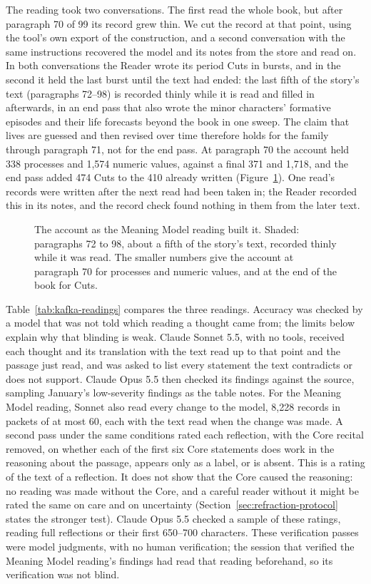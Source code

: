 \documentclass[11pt]{article}
\begin{document}
The reading took two conversations. The first read the whole book, but after
paragraph 70 of 99 its record grew thin. We cut the record at that point, using
the tool's own export of the construction, and a second conversation with the
same instructions recovered the model and its notes from the store and read on.
In both conversations the Reader wrote its period Cuts in bursts, and in the
second it held the last burst until the text had ended: the last fifth of the
story's text (paragraphs 72--98) is recorded thinly while it is read and filled in
afterwards, in an end pass that also wrote the minor characters' formative
episodes and their life forecasts beyond the book in one sweep. The claim that
lives are guessed and then revised over time therefore holds for the family
through paragraph 71, not for the end pass. At paragraph 70 the account held 338
processes and 1,574 numeric values, against a final 371 and 1,718, and the end
pass added 474 Cuts to the 410 already written
(Figure~\ref{fig:kafka-growth}). One read's records were written
after the next read had been taken in; the Reader recorded this in its notes,
and the record check found nothing in them from the later text.

\begin{figure}[htb]
    \centering
    
    \caption{The account as the Meaning Model reading built it. Shaded: paragraphs 72 to 98, about a fifth of the story's text, recorded thinly while it was read. The smaller numbers give the account at paragraph 70 for processes and numeric values, and at the end of the book for Cuts.}
    \label{fig:kafka-growth}
\end{figure}

Table~\ref{tab:kafka-readings} compares the three readings. Accuracy was
checked by a model that was not told which reading a thought came from; the
limits below explain why that blinding is weak. Claude Sonnet 5.5, with no tools, received each thought and its translation with
the text read up to that point and the passage just read, and was asked to list every
statement the text contradicts or does not support. Claude Opus 5.5 then
checked its findings against the source, sampling January's low-severity findings as the table notes. For the Meaning Model reading, Sonnet
also read every change to the model, 8,228 records in packets of at most 60,
each with the text read when the change was made. A second pass under the same conditions rated each reflection, with the Core
recital removed, on whether each of the first six Core statements does work in the reasoning
about the passage, appears only as a label, or is absent. This is a rating of the text of a
reflection. It does not show that the Core caused the reasoning: no reading
was made without the Core, and a careful reader without it might be rated the
same on care and on uncertainty (Section~\ref{sec:refraction-protocol} states
the stronger test). Claude Opus 5.5
checked a sample of these ratings, reading full reflections or their first
650--700 characters. These verification passes were model judgments, with no
human verification; the session that verified the Meaning Model reading's
findings had read that reading beforehand, so its verification was not blind.
\end{document}
